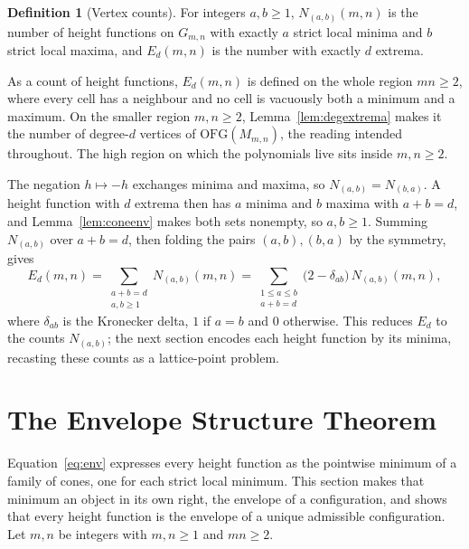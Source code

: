 \documentclass[11pt]{article}
\theoremstyle{definition}
\newtheorem{definition}[theorem]{Definition}
\theoremstyle{remark}
\newcommand{\OFG}{\mathrm{OFG}}
\newcommand{\Mm}{M_{m,n}}
\newcommand{\Gmn}{G_{m,n}}
\begin{document}
\begin{definition}[Vertex counts]\label{def:counts}
For integers $a,b\ge1$, $N_{(a,b)}(m,n)$ is the number of height functions
on $\Gmn$ with exactly $a$ strict local minima and $b$ strict local maxima,
and $E_d(m,n)$ is the number with exactly $d$ extrema.
\end{definition}

As a count of height functions, $E_d(m,n)$ is defined on the whole region
$mn\ge2$, where every cell has a neighbour and no cell is vacuously both a
minimum and a maximum. On the smaller region $m,n\ge2$, Lemma~\ref{lem:degextrema}
makes it the number of degree-$d$ vertices of $\OFG(\Mm)$, the reading intended
throughout. The high region on which the polynomials live sits inside $m,n\ge2$.

The negation $h\mapsto-h$ exchanges minima and maxima, so
$N_{(a,b)}=N_{(b,a)}$. A height function with $d$ extrema then has $a$ minima and
$b$ maxima with $a+b=d$, and Lemma~\ref{lem:coneenv} makes both sets nonempty, so
$a,b\ge1$. Summing
$N_{(a,b)}$ over $a+b=d$, then folding the pairs $(a,b),(b,a)$ by the
symmetry, gives
\begin{equation}\label{eq:Ed}
  E_d(m,n)=\sum_{\substack{a+b=d\\ a,b\ge1}}N_{(a,b)}(m,n)
          =\sum_{\substack{1\le a\le b\\ a+b=d}}\big(2-\delta_{ab}\big)\,N_{(a,b)}(m,n),
\end{equation}
where $\delta_{ab}$ is the Kronecker delta, $1$ if $a=b$ and $0$ otherwise. This
reduces $E_d$ to the counts $N_{(a,b)}$; the next section encodes each height
function by its minima, recasting these counts as a lattice-point problem.

\section{The Envelope Structure Theorem}\label{sec:envelope}

Equation~\eqref{eq:env} expresses every height function as the pointwise minimum of a
family of cones, one for each strict local minimum. This
section makes that minimum an object in its own right, the envelope of a
configuration, and shows that every height function is the envelope of a
unique admissible configuration. Let $m,n$ be integers with $m,n\ge1$ and
$mn\ge2$.
\end{document}
